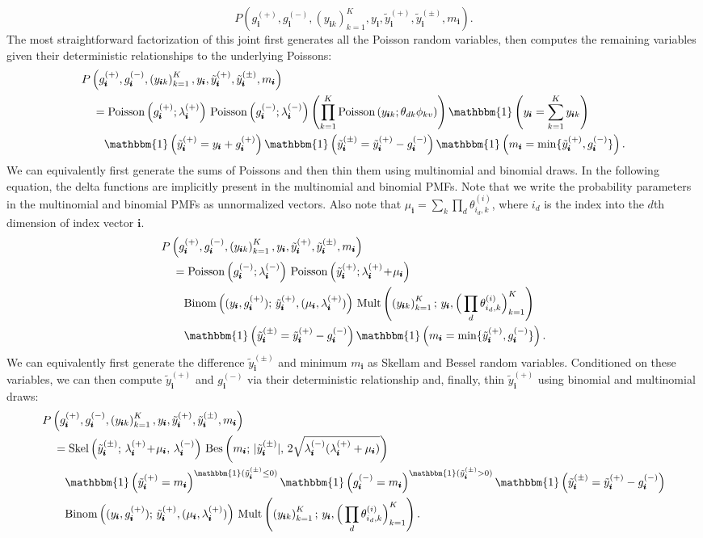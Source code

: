 \documentclass[letterpaper]{article}
\newcommand{\subs}{\pmb{i}}
\newcommand{\wsup}[2]{#1_{\subs}^{(#2)}}
\newcommand{\ytP}{\wsup{\tilde{y}}{+}}
\newcommand{\ytPM}{\wsup{\tilde{y}}{\pm}}
\newcommand{\ysk}{y_{\subs k}}
\newcommand{\ys}{y_{\subs}}
\newcommand{\lamP}{\wsup{\lambda}{+}}
\newcommand{\lamM}{\wsup{\lambda}{-}}
\newcommand{\gP}{\wsup{g}{+}}
\newcommand{\gM}{\wsup{g}{-}}
\newcommand{\ms}{m_{\subs}}
\newcommand{\Pois}[1]{\textup{Poisson}\left( #1 \right)}
\newcommand{\tp}{\!+\!}
\begin{document}
  \begin{equation}
  P\left(\gP, \gM, \left(\ysk\right)_{k=1}^K, \ys,
    \ytP, \ytPM, \ms\right).
  \end{equation}
  The most straightforward factorization of this joint first generates all the
  Poisson random variables, then computes the remaining variables given their
  deterministic relationships to the underlying Poissons:
  \begin{align}
  &P\left(\gP, \gM, \left(\ysk \right)_{k=1}^K, \ys,
    \ytP, \ytPM, \ms \right)\notag\\
  &\quad=\Pois{\gP; \lamP}\,\Pois{\gM; \lamM} \left(\prod_{k=1}^K \Pois{\ysk; \theta_{dk}\phi_{kv}}\right) \mathbbm{1} \left(\ys = \sum_{k=1}^K \ysk\right)\notag\\
  &\quad\quad \mathbbm{1}\left(\ytP = \ys + \gP\right) \mathbbm{1}\left(\ytPM = \ytP - \gM\right) \mathbbm{1}\left(\ms = \min\{\ytP, \gM\}\right).
  \end{align}
  We can equivalently first generate the sums of Poissons and then thin them
  using multinomial and binomial draws. In the following equation, the delta
  functions are implicitly present in the multinomial and binomial PMFs. Note
  that we write the probability parameters in the multinomial and binomial PMFs
  as unnormalized vectors. Also note that $\mu_{\subs} = \sum_k \prod_d
  \theta_{i_d,k}^{(i)}$, where $i_d$ is the index into the $d$th dimension of
  index vector $\subs$.
  \begin{align}
  &P\left(\gP, \gM, \left(\ysk\right)_{k=1}^K, \ys,
    \ytP, \ytPM, \ms\right) \notag \\
  &\quad= \Pois{\gM; \lamM} \,
    \Pois { \ytP; \lamP \tp \mu_{\subs} }
    \notag \\
  &\quad\quad \text{Binom}\left((\ys, \gP);\, \ytP,(\mu_{\subs}, \lamP)\right) \, \text{Mult}\left(\left(\ysk\right)_{k=1}^K;\, \ys, \Big( \prod_d \theta_{i_d,k}^{(i)} \Big)_{k=1}^K\right) \notag \\
  &\quad\quad \mathbbm{1}\left(\ytPM =
    \ytP - \gM\right) \mathbbm{1} \left( \ms =
    \min\{\ytP, \gM\} \right) .
  \end{align}
  We can equivalently first generate the difference $\ytPM$ and minimum $\ms$ as
  Skellam and Bessel random variables. Conditioned on these variables, we can
  then compute $\ytP$ and $\gM$ via their deterministic relationship and,
  finally, thin $\ytP$ using binomial and multinomial draws:
    \begin{align}
  &P\left(\gP, \gM, \left(\ysk\right)_{k=1}^K, \ys,
    \ytP, \ytPM, \ms\right)\notag\\
    \label{eqn:finalfact}
  &\quad= \text{Skel}\left(\ytPM;\, \lamP \tp \mu_{\subs},\, \lamM\right)\,\text{Bes}\left(\ms;\, |\ytPM|,\,2\sqrt{\lamM(\lamP+\mu_{\subs})}\right)\notag\\
  &\quad\quad \mathbbm{1} \left(\ytP=\ms\right)^{\mathbbm{1}(\ytPM \leq 0)} \mathbbm{1} \left(\gM=\ms\right)^{\mathbbm{1}(\ytPM > 0)} \mathbbm{1}\left(\ytPM = \ytP - \gM\right)\notag\\
  &\quad\quad \text{Binom}\left((\ys, \gP);\, \ytP, (\mu_{\subs}, \lamP)\right) \, \text{Mult}\left(\left(\ysk\right)_{k=1}^K;\, \ys, \Big( \prod_d \theta_{i_d,k}^{(i)} \Big)_{k=1}^K\right).
  \end{align}
\end{document}

